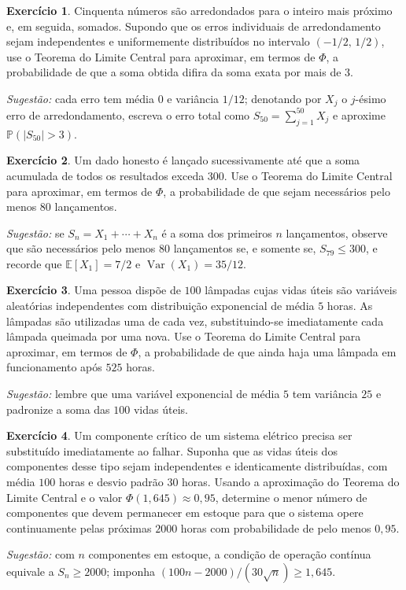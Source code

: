 \documentclass[12pt,portuguese]{article}
\theoremstyle{definition}
\theoremstyle{plainexercise}
\newtheorem{exercise}{Exercício}
\theoremstyle{starredexercise}
\theoremstyle{definition}
\begin{document}
\begin{exercise}\label{exercise:ross-8-5}
Cinquenta números são arredondados para o inteiro mais próximo e, em seguida,
somados. Supondo que os erros individuais de arredondamento sejam independentes e
uniformemente distribuídos no intervalo $(-1/2,\,1/2)$, use o Teorema do Limite
Central para aproximar, em termos de $\Phi$, a probabilidade de que a soma
obtida difira da soma exata por mais de $3$.

\noindent\emph{Sugestão:} cada erro tem média $0$ e variância $1/12$; denotando por $X_j$ o
$j$-ésimo erro de arredondamento, escreva o erro total como $S_{50}=\sum_{j=1}^{50}X_j$
e aproxime $\mathbb{P}(|S_{50}|>3)$.
\end{exercise}

\begin{exercise}\label{exercise:ross-8-6}
Um dado honesto é lançado sucessivamente até que a soma acumulada de todos os
resultados exceda $300$. Use o Teorema do Limite Central para aproximar, em
termos de $\Phi$, a probabilidade de que sejam necessários pelo menos $80$
lançamentos.

\noindent\emph{Sugestão:} se $S_n=X_1+\cdots+X_n$ é a soma dos primeiros $n$
lançamentos, observe que são necessários pelo menos $80$ lançamentos se, e
somente se, $S_{79}\leqslant300$, e recorde que $\mathbb{E}[X_1]=7/2$ e
$\operatorname{Var}(X_1)=35/12$.
\end{exercise}

\begin{exercise}\label{exercise:ross-8-7}
Uma pessoa dispõe de $100$ lâmpadas cujas vidas úteis são variáveis aleatórias
independentes com distribuição exponencial de média $5$ horas. As lâmpadas são
utilizadas uma de cada vez, substituindo-se imediatamente cada lâmpada queimada
por uma nova. Use o Teorema do Limite Central para aproximar, em termos de
$\Phi$, a probabilidade de que ainda haja uma lâmpada em funcionamento após
$525$ horas.

\noindent\emph{Sugestão:} lembre que uma variável exponencial de média $5$ tem variância
$25$ e padronize a soma das $100$ vidas úteis.
\end{exercise}

\begin{exercise}\label{exercise:ross-8-14}
Um componente crítico de um sistema elétrico precisa ser substituído
imediatamente ao falhar. Suponha que as vidas úteis dos componentes desse tipo
sejam independentes e identicamente distribuídas, com média $100$ horas e desvio
padrão $30$ horas. Usando a aproximação do Teorema do Limite Central e o valor
$\Phi(1{,}645)\approx0{,}95$, determine o menor número de componentes que devem
permanecer em estoque para que o sistema opere continuamente pelas próximas
$2000$ horas com probabilidade de pelo menos $0{,}95$.

\noindent\emph{Sugestão:} com $n$ componentes em estoque, a condição de operação contínua
equivale a $S_n\geqslant2000$; imponha $(100n-2000)/(30\sqrt{n})\geqslant1{,}645$.
\end{exercise}
\end{document}
